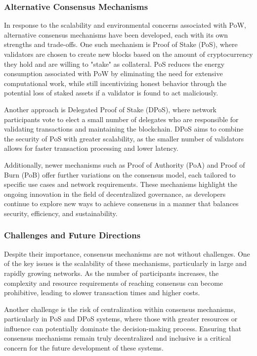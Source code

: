 \documentclass[12pt,twoside]{article}
\begin{document}
\subsubsection{Alternative Consensus Mechanisms}

In response to the scalability and environmental concerns associated with PoW, alternative consensus mechanisms have been developed, each with its own strengths and trade-offs. One such mechanism is Proof of Stake (PoS), where validators are chosen to create new blocks based on the amount of cryptocurrency they hold and are willing to "stake" as collateral. PoS reduces the energy consumption associated with PoW by eliminating the need for extensive computational work, while still incentivizing honest behavior through the potential loss of staked assets if a validator is found to act maliciously.

Another approach is Delegated Proof of Stake (DPoS), where network participants vote to elect a small number of delegates who are responsible for validating transactions and maintaining the blockchain. DPoS aims to combine the security of PoS with greater scalability, as the smaller number of validators allows for faster transaction processing and lower latency.

Additionally, newer mechanisms such as Proof of Authority (PoA) and Proof of Burn (PoB) offer further variations on the consensus model, each tailored to specific use cases and network requirements. These mechanisms highlight the ongoing innovation in the field of decentralized governance, as developers continue to explore new ways to achieve consensus in a manner that balances security, efficiency, and sustainability.

\subsubsection{Challenges and Future Directions}

Despite their importance, consensus mechanisms are not without challenges. One of the key issues is the scalability of these mechanisms, particularly in large and rapidly growing networks. As the number of participants increases, the complexity and resource requirements of reaching consensus can become prohibitive, leading to slower transaction times and higher costs.

Another challenge is the risk of centralization within consensus mechanisms, particularly in PoS and DPoS systems, where those with greater resources or influence can potentially dominate the decision-making process. Ensuring that consensus mechanisms remain truly decentralized and inclusive is a critical concern for the future development of these systems.
\end{document}
